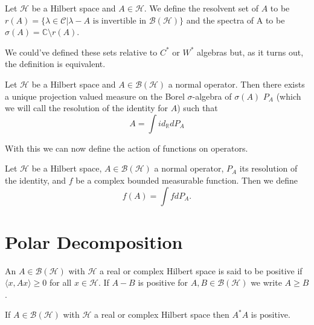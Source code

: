 \begin{definition}
Let $\mathcal{H}$ be a Hilbert space and $A\in\mathcal{H}$. We define the resolvent set of $A$ to be $r(A)=\{\lambda\in\mathcal{C}|\lambda-A \text{ is invertible in } \mathcal{B}(\mathcal{H})\}$ and the spectra of A to be $\sigma(A)=\mathbb{C}\setminus r(A)$.
\end{definition}

We could've defined these sets relative to $C^*$ or $W^*$ algebras but, as it turns out, the definition is equivalent\cite{Bratteli1997}.

\begin{theorem}
Let $\mathcal{H}$ be a Hilbert space and $A\in\mathcal{B}(\mathcal{H})$ a normal operator. Then there exists a unique projection valued measure on the Borel $\sigma$-algebra of $\sigma(A)$ $P_A$ (which we will call the resolution of the identity for $A$) such that
\begin{equation}
A=\int id_{\mathbb{R}}dP_A
\end{equation}
\end{theorem}

With this we can now define the action of functions on operators.

\begin{definition}
Let $\mathcal{H}$ be a Hilbert space, $A\in\mathcal{B}(\mathcal{H})$ a normal operator, $P_A$ its resolution of the identity, and $f$ be a complex bounded measurable function. Then we define
\begin{equation}
f(A)=\int f dP_A.
\end{equation} 
\end{definition}

\section{Polar Decomposition}

\begin{definition}
An $A\in\mathcal{B}(\mathcal{H})$ with $\mathcal{H}$ a real or complex Hilbert space is said to be positive if $\langle x,Ax\rangle\geq 0$ for all $x\in\mathcal{H}$. If $A-B$ is positive for $A,B\in\mathcal{B}(\mathcal{H})$ we write $A\geq B$. 
\end{definition}

\begin{theorem}
If $A\in\mathcal{B}(\mathcal{H})$ with $\mathcal{H}$ a real or complex Hilbert space then $A^*A$ is positive. 
\end{theorem}

